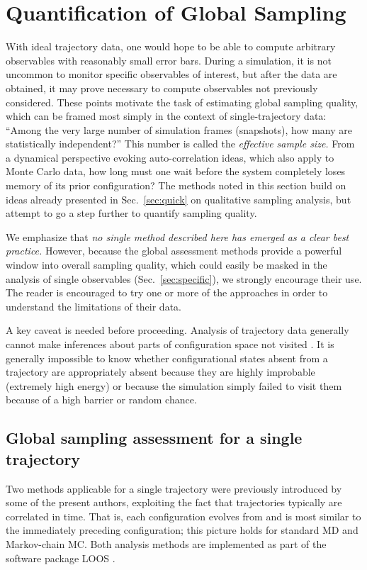 \section{Quantification of Global Sampling}
\label{sec:global}


With ideal trajectory data, one would hope to be able to compute arbitrary observables with reasonably small error bars.
During a simulation, it is not uncommon to monitor specific observables of interest, but after the data are obtained, it may prove necessary to compute observables not previously considered.
These points motivate the task of estimating global sampling quality, which can be framed most simply in the context of single-trajectory data:
``Among the very large number of simulation frames (snapshots), how many are statistically independent?''
This number is called the \emph{effective sample size.}
From a dynamical perspective evoking auto-correlation ideas, which also apply to Monte Carlo data, how long must one wait before the system completely loses memory of its prior configuration?
The methods noted in this section build on ideas already presented in Sec.\ \ref{sec:quick} on qualitative sampling analysis, but attempt to go a step further to quantify sampling quality.

We emphasize that \emph{no single method described here has emerged as a clear best practice.}
However, because the global assessment methods provide a powerful window into overall sampling quality, which could easily be masked in the analysis of single observables (Sec.\ \ref{sec:specific}), we strongly encourage their use.
The reader is encouraged to try one or more of the approaches in order to understand the limitations of their data.


A key caveat is needed before proceeding.
Analysis of trajectory data generally cannot make inferences about parts of configuration space not visited \cite{Grossfield2009}.
It is generally impossible to know whether configurational states absent from a trajectory are appropriately absent because they are highly improbable (extremely high energy) or because the simulation simply failed to visit them because of a high barrier or random chance.

\subsection{Global sampling assessment for a single trajectory}
Two methods applicable for a single trajectory were previously introduced by some of the present authors, exploiting the fact that trajectories typically are correlated in time.
That is, each configuration evolves from and is most similar to the immediately preceding configuration;
this picture holds for standard MD and Markov-chain MC.
Both analysis methods are implemented as part of the software package LOOS \cite{LOOS,LOOS-JCC}.

